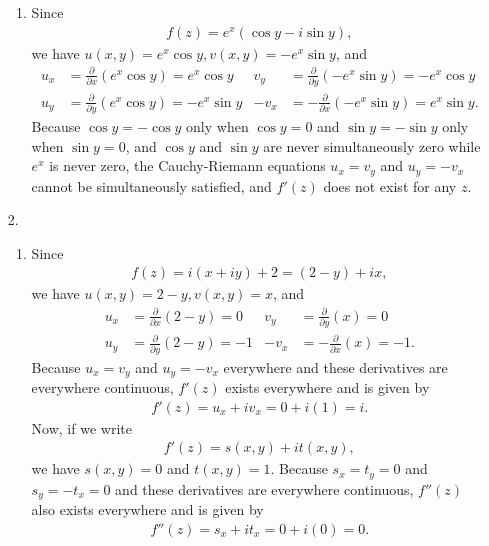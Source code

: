 \documentclass[a4paper,12pt]{article}
\begin{document}
\begin{enumerate}
\begin{enumerate}
            \item
                Since
                \begin{align*}
                    f(z) = e^x(\cos y - i \sin y),
                \end{align*}
                we have $u(x, y) = e^x \cos y, v(x, y) = -e^x \sin y$, and
                \begin{align*}
                    u_x &= \frac{\partial}{\partial x}(e^x \cos y) = e^x \cos y &v_y &= \frac{\partial}{\partial y}(-e^x \sin y) = -e^x \cos y \\
                    u_y &= \frac{\partial}{\partial y}(e^x \cos y) = -e^x \sin y &-v_x &= -\frac{\partial}{\partial x}(-e^x \sin y) = e^x \sin y.
                \end{align*}
                Because $\cos y = -\cos y$ only when $\cos y = 0$ and $\sin y = -\sin y$ only when $\sin y = 0$, and $\cos y$ and $\sin y$ are never simultaneously zero while $e^x$ is never zero, the Cauchy-Riemann equations $u_x = v_y$ and $u_y = -v_x$ cannot be simultaneously satisfied, and $f'(z)$ does not exist for any $z$.
        \end{enumerate}

    \item[2.]
        \begin{enumerate}
            \item
                Since
                \begin{align*}
                    f(z) = i(x + iy) + 2 = (2 - y) + ix,
                \end{align*}
                we have $u(x, y) = 2 - y, v(x, y) = x$, and
                \begin{align*}
                    u_x &= \frac{\partial}{\partial x}(2 - y) = 0 &
                    v_y &= \frac{\partial}{\partial y}(x) = 0 \\
                    u_y &= \frac{\partial}{\partial y}(2 - y) = -1 &
                    -v_x &= -\frac{\partial}{\partial x}(x) = -1.
                \end{align*}
                Because $u_x = v_y$ and $u_y = -v_x$ everywhere and these derivatives are everywhere continuous, $f'(z)$ exists everywhere and is given by
                \begin{align*}
                    f'(z) = u_x + iv_x = 0 + i(1) = i.
                \end{align*}
                Now, if we write
                \begin{align*}
                    f'(z) = s(x, y) + it(x, y),
                \end{align*}
                we have $s(x, y) = 0$ and $t(x, y) = 1$. Because $s_x = t_y = 0$ and $s_y = -t_x = 0$ and these derivatives are everywhere continuous, $f''(z)$ also exists everywhere and is given by
                \begin{align*}
                    f''(z) = s_x + it_x = 0 + i(0) = 0.
                \end{align*}


\end{enumerate}
\end{enumerate}
\end{document}
